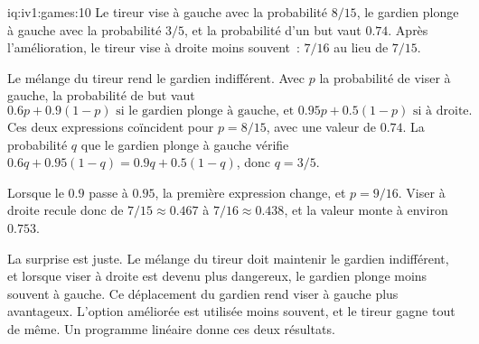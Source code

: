 \begin{solution}{iq:iv1:games:10}
Le tireur vise à gauche avec la probabilité $8/15$, le gardien plonge à gauche avec la probabilité $3/5$, et la probabilité d'un but vaut $0.74$. Après l'amélioration, le tireur vise à droite moins souvent~: $7/16$ au lieu de $7/15$.

Le mélange du tireur rend le gardien indifférent. Avec $p$ la probabilité de viser à gauche, la probabilité de but vaut
\[
0.6p + 0.9(1 - p) \text{ si le gardien plonge à gauche, et } 0.95p + 0.5(1 - p) \text{ si à droite.}
\]
Ces deux expressions coïncident pour $p = 8/15$, avec une valeur de $0.74$. La probabilité $q$ que le gardien plonge à gauche vérifie $0.6q + 0.95(1 - q) = 0.9q + 0.5(1 - q)$, donc $q = 3/5$.

Lorsque le $0.9$ passe à $0.95$, la première expression change, et $p = 9/16$. Viser à droite recule donc de $7/15 \approx 0.467$ à $7/16 \approx 0.438$, et la valeur monte à environ $0.753$.

La surprise est juste. Le mélange du tireur doit maintenir le gardien indifférent, et lorsque viser à droite est devenu plus dangereux, le gardien plonge moins souvent à gauche. Ce déplacement du gardien rend viser à gauche plus avantageux. L'option améliorée est utilisée moins souvent, et le tireur gagne tout de même. Un programme linéaire donne ces deux résultats.

\end{solution}

